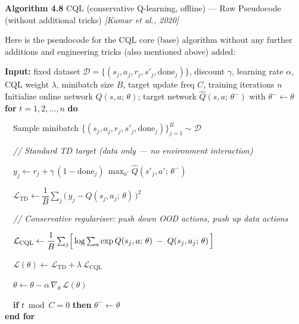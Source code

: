 \documentclass[11pt]{article}
\begin{document}
    \begin{pseudobox}

\textbf{Algorithm 4.8} CQL (conservative Q-learning, offline) --- Raw
Pseudocode (without additional tricks) \emph{{[}Kumar et al., 2020{]}}

\tcbline

Here is the pseudocode for the CQL core (base) algorithm without any
further additions and engineering tricks (also mentioned above) added:

\textbf{Input:} fixed dataset
\(\mathcal{D} = \{(s_j, a_j, r_j, s'_j, \text{done}_j)\}\), discount
\(\gamma\), learning rate \(\alpha\), CQL weight \(\lambda\), minibatch
size \(B\), target update freq \(C\), training iterations \(n\)\\
Initialize online network \(Q(s, a;\, \theta)\); target network
\(\hat{Q}(s, a;\, \theta^{-})\) with \(\theta^{-} \leftarrow \theta\)\\
\textbf{for} \(t = 1, 2, \ldots, n\) \textbf{do}\\
\strut ~~Sample minibatch
\(\{(s_j, a_j, r_j, s'_j, \text{done}_j)\}_{j=1}^{B} \sim \mathcal{D}\)\\
\strut ~~\emph{// Standard TD target (data only --- no environment
interaction)}\\
\strut ~~\(y_j \leftarrow r_j + \gamma\,(1 - \text{done}_j)\, \max_{a'} \hat{Q}(s'_j, a';\, \theta^{-})\)\\
\strut ~~\(\mathcal{L}_{\text{TD}} \leftarrow \dfrac{1}{B} \sum_j \bigl(\, y_j - Q(s_j, a_j;\, \theta) \,\bigr)^{2}\)\\
\strut ~~\emph{// Conservative regulariser: push down OOD actions, push
up data actions}\\
\strut ~~\(\mathcal{L}_{\text{CQL}} \leftarrow \dfrac{1}{B} \sum_j \Bigl[\, \log \sum_{a} \exp Q(s_j, a;\, \theta)\; -\; Q(s_j, a_j;\, \theta) \,\Bigr]\)\\
\strut ~~\(\mathcal{L}(\theta) \leftarrow \mathcal{L}_{\text{TD}} + \lambda\, \mathcal{L}_{\text{CQL}}\)\\
\strut ~~\(\theta \leftarrow \theta - \alpha\, \nabla_{\theta}\, \mathcal{L}(\theta)\)\\
\strut ~~\textbf{if} \(t \bmod C = 0\) \textbf{then}
\(\theta^{-} \leftarrow \theta\)\\
\textbf{end for}

\end{pseudobox}
\end{document}

